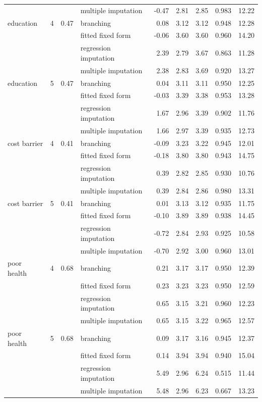 \begin{table}[h]
\begin{tabular}{lrrlrrrrr}
 &  &  & multiple imputation & -0.47 & 2.81 & 2.85 & 0.983 & 12.22 \\
education & 4 & 0.47 & branching & 0.08 & 3.12 & 3.12 & 0.948 & 12.28 \\
 &  &  & fitted fixed form & -0.06 & 3.60 & 3.60 & 0.960 & 14.20 \\
 &  &  & regression imputation & 2.39 & 2.79 & 3.67 & 0.863 & 11.28 \\
 &  &  & multiple imputation & 2.38 & 2.83 & 3.69 & 0.920 & 13.27 \\
education & 5 & 0.47 & branching & 0.04 & 3.11 & 3.11 & 0.950 & 12.25 \\
 &  &  & fitted fixed form & -0.03 & 3.39 & 3.38 & 0.953 & 13.28 \\
 &  &  & regression imputation & 1.67 & 2.96 & 3.39 & 0.902 & 11.76 \\
 &  &  & multiple imputation & 1.66 & 2.97 & 3.39 & 0.935 & 12.73 \\
cost barrier & 4 & 0.41 & branching & -0.09 & 3.23 & 3.22 & 0.945 & 12.01 \\
 &  &  & fitted fixed form & -0.18 & 3.80 & 3.80 & 0.943 & 14.75 \\
 &  &  & regression imputation & 0.39 & 2.82 & 2.85 & 0.930 & 10.76 \\
 &  &  & multiple imputation & 0.39 & 2.84 & 2.86 & 0.980 & 13.31 \\
cost barrier & 5 & 0.41 & branching & 0.01 & 3.13 & 3.12 & 0.935 & 11.75 \\
 &  &  & fitted fixed form & -0.10 & 3.89 & 3.89 & 0.938 & 14.45 \\
 &  &  & regression imputation & -0.72 & 2.84 & 2.93 & 0.925 & 10.58 \\
 &  &  & multiple imputation & -0.70 & 2.92 & 3.00 & 0.960 & 13.01 \\
poor health & 4 & 0.68 & branching & 0.21 & 3.17 & 3.17 & 0.950 & 12.39 \\
 &  &  & fitted fixed form & 0.23 & 3.23 & 3.23 & 0.950 & 12.59 \\
 &  &  & regression imputation & 0.65 & 3.15 & 3.21 & 0.960 & 12.23 \\
 &  &  & multiple imputation & 0.65 & 3.15 & 3.22 & 0.965 & 12.57 \\
poor health & 5 & 0.68 & branching & 0.09 & 3.17 & 3.16 & 0.945 & 12.37 \\
 &  &  & fitted fixed form & 0.14 & 3.94 & 3.94 & 0.940 & 15.04 \\
 &  &  & regression imputation & 5.49 & 2.96 & 6.24 & 0.515 & 11.44 \\
 &  &  & multiple imputation & 5.48 & 2.96 & 6.23 & 0.667 & 13.23 \\
\bottomrule
\end{tabular}
\end{table}
